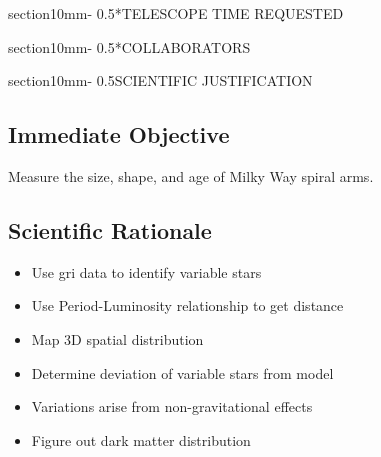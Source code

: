 \documentclass[letterpaper,11pt]{article}
\makeatletter
\renewcommand{\section}{\@startsection%
{section}{1}{0mm}{-\baselineskip}%
{0.5\baselineskip}{\normalfont\Large\bfseries}}%
\makeatother
\begin{document}
\section*{TELESCOPE TIME REQUESTED}

\section*{COLLABORATORS}
\begin{table}[H]\label{tab:collabs}
\begin{center}
\end{center}
\end{table}



\section{SCIENTIFIC JUSTIFICATION}

\subsection{Immediate Objective}
Measure the size, shape, and age of Milky Way spiral arms. \\

\subsection{Scientific Rationale}
\begin{itemize}
	\item{} Use gri data to identify variable stars
	\item{} Use Period-Luminosity relationship to get distance
	\item{} Map 3D spatial distribution
	\item{} Determine deviation of variable stars from model
	\item{} Variations arise from non-gravitational effects
	\item{} Figure out dark matter distribution
\end{itemize}
\end{document}
